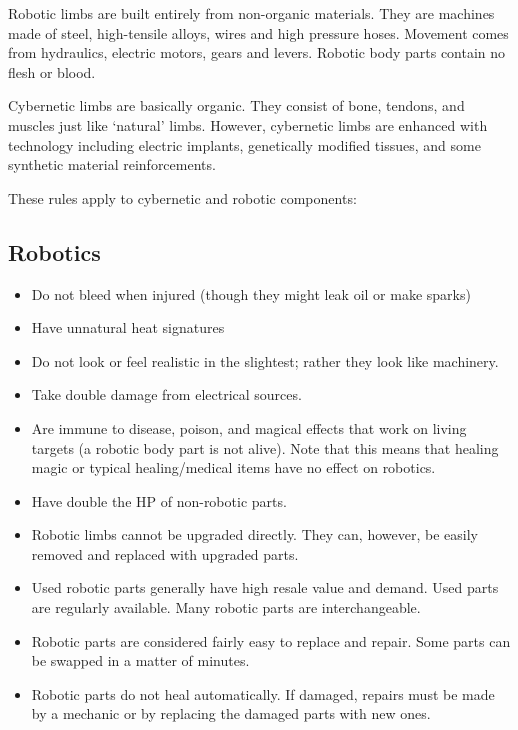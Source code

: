 \documentclass[twoside]{book}
\begin{document}
    {  
     Robotic limbs are built entirely from non-organic
             materials. They are machines made of steel, high-tensile
             alloys, wires and high pressure hoses. Movement comes from
             hydraulics, electric motors, gears and levers. Robotic body
             parts contain no flesh or blood. 
    }
  
    {  
     Cybernetic limbs are basically organic. They consist
             of bone, tendons, and muscles just like
             `natural' limbs. However, cybernetic limbs are
             enhanced with technology including electric implants,
             genetically modified tissues, and some synthetic material
             reinforcements. 
    }
  
    {  
     These rules apply to cybernetic and robotic
             components: 
    }
  
    

\subsection{Robotics}
    
\begin{itemize}
      
  \item   Do not bleed when injured (though they might leak
                 oil or make sparks) 
  \item   Have unnatural heat signatures 
  \item   Do not look or feel realistic in the slightest;
                 rather they look like machinery. 
  \item   Take double damage from electrical sources.
                 
  \item   Are immune to disease, poison, and magical
                 effects that work on living targets (a robotic body part
                 is not alive). Note that this means that healing magic
                 or typical healing/medical items have no effect on
                 robotics. 
  \item   Have double the HP of non-robotic parts. 
  \item   Robotic limbs cannot be upgraded directly. They
                 can, however, be easily removed and replaced with
                 upgraded parts. 
  \item   Used robotic parts generally have high resale
                 value and demand. Used parts are regularly available.
                 Many robotic parts are interchangeable. 
  \item   Robotic parts are considered fairly easy to
                 replace and repair. Some parts can be swapped in a
                 matter of minutes. 
  \item   Robotic parts do not heal automatically. If
                 damaged, repairs must be made by a mechanic or by
                 replacing the damaged parts with new ones. 
\end{itemize}
  
\end{document}
